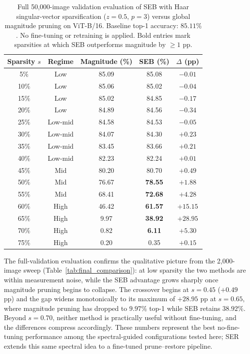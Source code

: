 \documentclass[11pt]{article}
\theoremstyle{plain}
\theoremstyle{definition}
\theoremstyle{remark}
\newcommand{\1}{\mathbf{1}}
\begin{document}
\begin{table}[ht]
\centering
\caption{Full 50{,}000-image validation evaluation of SEB with Haar singular-vector sparsification (\(z=0.5\), \(p=3\)) versus global magnitude pruning on ViT-B/16.  Baseline top-1 accuracy: \(85.11\%\).  No fine-tuning or retraining is applied.  Bold entries mark sparsities at which SEB outperforms magnitude by \(\ge 1\) pp.}
\label{tab:final_comparison_10k}
\begin{tabular}{ccccc}
\toprule
Sparsity \(s\) & Regime & Magnitude (\%) & SEB (\%) & \(\Delta\) (pp) \\
\midrule
5\%  & Low     & 85.09 & 85.08         & \(-0.01\) \\
10\% & Low     & 85.06 & 85.02         & \(-0.04\) \\
15\% & Low     & 85.02 & 84.85         & \(-0.17\) \\
20\% & Low     & 84.89 & 84.56         & \(-0.34\) \\
\midrule
25\% & Low-mid & 84.58 & 84.53         & \(-0.05\) \\
30\% & Low-mid & 84.07 & 84.30         & \(+0.23\) \\
35\% & Low-mid & 83.45 & 83.66         & \(+0.21\) \\
40\% & Low-mid & 82.23 & 82.24         & \(+0.01\) \\
\midrule
45\% & Mid     & 80.20 & 80.70         & \(+0.49\) \\
50\% & Mid     & 76.67 & \textbf{78.55} & \(+1.88\) \\
55\% & Mid     & 68.41 & \textbf{72.68} & \(+4.28\) \\
\midrule
60\% & High    & 46.42 & \textbf{61.57} & \(+15.15\) \\
65\% & High    &  9.97 & \textbf{38.92} & \(+28.95\) \\
70\% & High    &  0.82 & \textbf{6.11}  & \(+5.30\) \\
75\% & High    &  0.20 & 0.35          & \(+0.15\) \\
\bottomrule
\end{tabular}
\end{table}

The full-validation evaluation confirms the qualitative picture from the 2{,}000-image sweep (Table~\ref{tab:final_comparison}): at low sparsity the two methods are within measurement noise, while the SEB advantage grows sharply once magnitude pruning begins to collapse.  The crossover begins at \(s=0.45\) (\(+0.49\) pp) and the gap widens monotonically to its maximum of \(+28.95\) pp at \(s=0.65\), where magnitude pruning has dropped to \(9.97\%\) top-1 while SEB retains \(38.92\%\).  Beyond \(s=0.70\), neither method is practically useful without fine-tuning, and the differences compress accordingly.  These numbers represent the best no-fine-tuning performance among the spectral-guided configurations tested here; SER extends this same spectral idea to a fine-tuned prune--restore pipeline.
\end{document}
